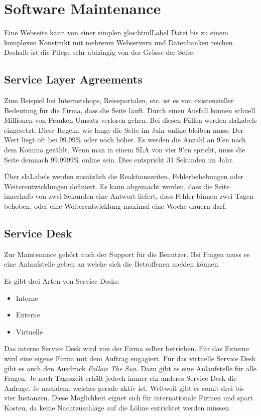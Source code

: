 \chapter{Software Maintenance}
Eine Webseite kann von einer simplen \Gls{glos:htmlLabel} Datei bis zu einem komplexen Konstrukt mit mehreren Webservern und Datenbanken reichen. Deshalb ist die Pflege sehr abhängig von der Grösse der Seite. 

\section{Service Layer Agreements}
Zum Beispiel bei Internetshops, Reiseportalen, etc. ist es von existenzieller Bedeutung für die Firma, dass die Seite läuft. Durch einen Ausfall können schnell Millionen von Franken Umsatz verloren gehen. Bei diesen Fällen werden \glspl{slaLabel} eingesetzt. Diese Regeln, wie lange die Seite im Jahr online bleiben muss. Der Wert liegt oft bei 99.99\% oder noch höher. Es werden die Anzahl an 9'en nach dem Komma gezählt. Wenn man in einem SLA von vier 9’en spricht, muss die Seite demnach 99.9999\% online sein. Dies entspricht 31 Sekunden im Jahr.

Über \glspl{slaLabel} werden zusätzlich die Reaktionszeiten, Fehlerbehebungen oder Weiterentwicklungen definiert. Es kann abgemacht werden, dass die Seite innerhalb von zwei Sekunden eine Antwort liefert, dass Fehler binnen zwei Tagen behoben, oder eine Weiterentwicklung maximal eine Woche dauern darf.

\section{Service Desk}
Zur Maintenance gehört auch der Support für die Benutzer. Bei Fragen muss es eine Anlaufstelle geben an welche sich die Betroffenen melden können.

Es gibt drei Arten von Service Desks:
\begin{itemize}
\item Interne
\item Externe
\item Virtuelle
\end{itemize}

Das interne Service Desk wird von der Firma selber betrieben. Für das Externe wird eine eigene Firma mit dem Auftrag engagiert. Für das virtuelle Service Desk gibt es auch den Ausdruck \textit{Follow The Sun}. Dazu gibt es eine Anlaufstelle für alle Fragen. Je nach Tageszeit erhält jedoch immer ein anderes Service Desk die Anfrage. Je nachdem, welches gerade aktiv ist. Weltweit gibt es somit drei bis vier Instanzen. Diese Möglichkeit eignet sich für internationale Firmen und spart Kosten, da keine Nachtzuschläge auf die Löhne entrichtet werden müssen.